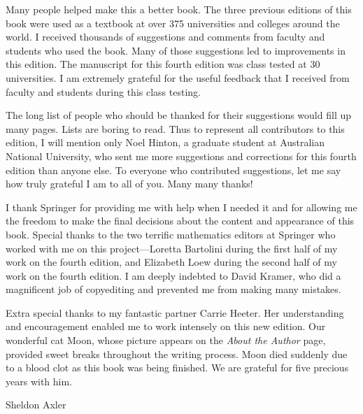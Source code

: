 Many people helped make this a better book. The three previous editions of this book were used as a textbook at over 375 universities and colleges around the world. I received thousands of suggestions and comments from faculty and students who used the book. Many of those suggestions led to improvements in this edition. The manuscript for this fourth edition was class tested at 30 universities. I am extremely grateful for the useful feedback that I received from faculty and students during this class testing.

The long list of people who should be thanked for their suggestions would fill up many pages. Lists are boring to read. Thus to represent all contributors to this edition, I will mention only Noel Hinton, a graduate student at Australian National University, who sent me more suggestions and corrections for this fourth edition than anyone else. To everyone who contributed suggestions, let me say how truly grateful I am to all of you. Many many thanks!

I thank Springer for providing me with help when I needed it and for allowing me the freedom to make the final decisions about the content and appearance of this book. Special thanks to the two terrific mathematics editors at Springer who worked with me on this project---Loretta Bartolini during the first half of my work on the fourth edition, and Elizabeth Loew during the second half of my work on the fourth edition. I am deeply indebted to David Kramer, who did a magnificent job of copyediting and prevented me from making many mistakes.

Extra special thanks to my fantastic partner Carrie Heeter. Her understanding and encouragement enabled me to work intensely on this new edition. Our wonderful cat Moon, whose picture appears on the \textit{About the Author} page, provided sweet breaks throughout the writing process. Moon died suddenly due to a blood clot as this book was being finished. We are grateful for five precious years with him.

\bigskip

\hfill Sheldon Axler

\clearpage
{}

\endinput
